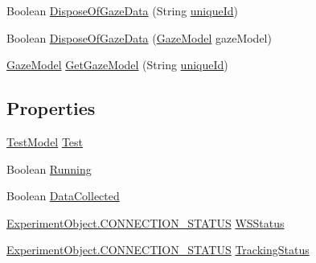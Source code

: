\begin{DoxyCompactItemize}
\item 
Boolean \hyperlink{class_web_analyzer_1_1_controller_1_1_test_controller_ae88c0e776f3d18dc0c0cfc2106b2f1a5}{Dispose\+Of\+Gaze\+Data} (String \hyperlink{_u_i_2_h_t_m_l_resources_2js_2lib_2underscore_8min_8js_af690ff5521d79c7128861033ae80ae17}{unique\+Id})
\item 
Boolean \hyperlink{class_web_analyzer_1_1_controller_1_1_test_controller_a99b6f672f4ef0293ac70edb20e1c7cdb}{Dispose\+Of\+Gaze\+Data} (\hyperlink{class_web_analyzer_1_1_models_1_1_data_model_1_1_gaze_model}{Gaze\+Model} gaze\+Model)
\item 
\hyperlink{class_web_analyzer_1_1_models_1_1_data_model_1_1_gaze_model}{Gaze\+Model} \hyperlink{class_web_analyzer_1_1_controller_1_1_test_controller_ad375d558e5d63a79680f3fe53f1326b4}{Get\+Gaze\+Model} (String \hyperlink{_u_i_2_h_t_m_l_resources_2js_2lib_2underscore_8min_8js_af690ff5521d79c7128861033ae80ae17}{unique\+Id})
\end{DoxyCompactItemize}
\subsection*{Properties}
\begin{DoxyCompactItemize}
\item 
\hyperlink{class_web_analyzer_1_1_models_1_1_data_model_1_1_test_model}{Test\+Model} \hyperlink{class_web_analyzer_1_1_controller_1_1_test_controller_afcf9572f80c31e6d9aca33f96e3aaa4f}{Test}
\item 
Boolean \hyperlink{class_web_analyzer_1_1_controller_1_1_test_controller_a4020785450ade4a26f603d667ce633d6}{Running}
\item 
Boolean \hyperlink{class_web_analyzer_1_1_controller_1_1_test_controller_a741cf98b95422a4a307bf8834db147b3}{Data\+Collected}
\item 
\hyperlink{class_web_analyzer_1_1_u_i_1_1_interaction_objects_1_1_experiment_object_a2875208b4f4b0ed643593152f4ec025c}{Experiment\+Object.\+C\+O\+N\+N\+E\+C\+T\+I\+O\+N\+\_\+\+S\+T\+A\+T\+U\+S} \hyperlink{class_web_analyzer_1_1_controller_1_1_test_controller_a1f3032c3be238b03976be19319a64eeb}{W\+S\+Status}
\item 
\hyperlink{class_web_analyzer_1_1_u_i_1_1_interaction_objects_1_1_experiment_object_a2875208b4f4b0ed643593152f4ec025c}{Experiment\+Object.\+C\+O\+N\+N\+E\+C\+T\+I\+O\+N\+\_\+\+S\+T\+A\+T\+U\+S} \hyperlink{class_web_analyzer_1_1_controller_1_1_test_controller_adc0db19e3cc5958f24dd5fd09ce34d98}{Tracking\+Status}
\end{DoxyCompactItemize}

